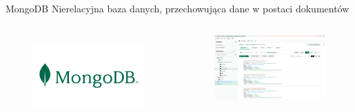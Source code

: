 \begin{frame}{\insertsection}
	\begin{block}{MongoDB}
		Nierelacyjna baza danych, przechowująca dane w postaci dokumentów
	\end{block}
	\begin{columns}
			\begin{figure}
			\centering
			\includegraphics[width=1\linewidth]{../images/MongoLogo}
			\label{fig:mongologo}
		\end{figure}
			\begin{figure}
			\centering
			\includegraphics[width=1\linewidth]{../images/MongoData}

			\label{fig:mongodata}
		\end{figure}
	\end{columns}
\end{frame}
